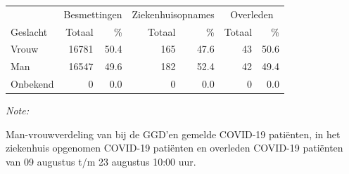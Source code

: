 \documentclass[
  english,
  man,floatsintext]{apa6}
\begin{document}
\begin{table}
\centering\begingroup\fontsize{11}{13}\selectfont

\begin{threeparttable}
\begin{tabular}{lrrrrrr}
\toprule
\multicolumn{1}{c}{ } & \multicolumn{2}{c}{Besmettingen} & \multicolumn{2}{c}{Ziekenhuisopnames} & \multicolumn{2}{c}{Overleden} \\
\cmidrule(l{3pt}r{3pt}){2-3} \cmidrule(l{3pt}r{3pt}){4-5} \cmidrule(l{3pt}r{3pt}){6-7}
Geslacht & Totaal & \% & Totaal & \% & Totaal & \%\\
\midrule
Vrouw & 16781 & 50.4 & 165 & 47.6 & 43 & 50.6\\
Man & 16547 & 49.6 & 182 & 52.4 & 42 & 49.4\\
Onbekend & 0 & 0.0 & 0 & 0.0 & 0 & 0.0\\
\bottomrule
\end{tabular}
\begin{tablenotes}
\item \textit{Note: } 
\item Man-vrouwverdeling van bij de GGD’en gemelde COVID-19 patiënten, in het ziekenhuis opgenomen COVID-19 patiënten en overleden COVID-19 patiënten van 09 augustus t/m 23 augustus 10:00 uur.
\end{tablenotes}
\end{threeparttable}
\endgroup{}
\end{table}
\newpage
\end{document}
